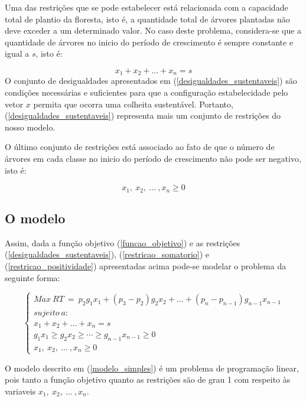 \documentclass[a4paper, 12pt]{article}
\begin{document}
Uma das restrições que se pode estabelecer está relacionada com a capacidade total de plantio da floresta, isto é, a quantidade total de árvores plantadas não deve exceder a um determinado valor. No caso deste problema, considera-se que a quantidade de árvores no inicio do período de crescimento é sempre constante e igual a $s$, isto é:

\begin{equation}\label{restricao_somatorio}
x_1+x_2+...+x_n=s
\end{equation}
O conjunto de desigualdades apresentados em (\ref{desigualdades_sustentaveis}) são condições necessárias e suficientes para que a configuração estabelecidade pelo vetor $x$ permita que ocorra uma colheita sustentável. Portanto, (\ref{desigualdades_sustentaveis}) representa mais um conjunto de restrições do nosso modelo.

O último conjunto de restrições está associado ao fato de que o número de árvores em cada classe no inicio do período de crescimento não pode ser negativo, isto é:

\begin{equation}\label{restricao_positividade}
    x_1{,}\ x_2{,}\ ...\ {,}x_n\ge 0
\end{equation}

\subsection{O modelo}

Assim, dada a função objetivo (\ref{funcao_objetivo}) e as restrições (\ref{desigualdades_sustentaveis}), (\ref{restricao_somatorio}) e (\ref{restricao_positividade}) apresentadas acima pode-se modelar o problema da seguinte forma:


\begin{equation}\label{modelo_simples}
    \begin{cases}
    Max\ RT\ =\ p_2g_1x_1+\left(p_3-p_2\right)g_2x_2+...+\left(p_n-p_{n-1}\right)g_{n-1}x_{n-1}\\
    sujeito\ a:\\
    x_1+x_2+...+x_n=s\\
    g_1x_1\ge g_2x_2\ge \cdots \ge g_{n-1}x_{n-1}\ge 0\\
    x_1{,}\ x_2{,}\ ...\ {,}x_n\ge 0
    \end{cases}
\end{equation}

O modelo descrito em (\ref{modelo_simples}) é um problema de programação linear, pois tanto a função objetivo quanto as restrições são de grau 1 com respeito às variaveis $x_1{,}\ x_2{,}\ ...\ {,}x_n$.
\end{document}
